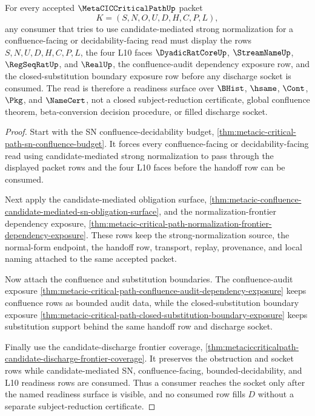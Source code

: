 \begin{theorem}
\label{thm:metacic-critical-path-sn-discharge-socket-readiness}
For every accepted $\MetaCICCriticalPathUp$ packet
$$
K=(S,N,O,U,D,H,C,P,L),
$$
any consumer that tries to use candidate-mediated strong normalization for a confluence-facing or decidability-facing read must display the rows $S,N,U,D,H,C,P,L$, the four L10 faces $\DyadicRatCoreUp$, $\StreamNameUp$, $\RegSeqRatUp$, and $\RealUp$, the confluence-audit dependency exposure row, and the closed-substitution boundary exposure row before any discharge socket is consumed. The read is therefore a readiness surface over $\BHist$, $\hsame$, $\Cont$, $\Pkg$, and $\NameCert$, not a closed subject-reduction certificate, global confluence theorem, beta-conversion decision procedure, or filled discharge socket.
\end{theorem}
\begin{proof}
Start with the SN confluence-decidability budget, \autoref{thm:metacic-critical-path-sn-confluence-budget}. It forces every confluence-facing or decidability-facing read using candidate-mediated strong normalization to pass through the displayed packet rows and the four L10 faces before the handoff row can be consumed.

Next apply the candidate-mediated obligation surface, \autoref{thm:metacic-confluence-candidate-mediated-sn-obligation-surface}, and the normalization-frontier dependency exposure, \autoref{thm:metacic-critical-path-normalization-frontier-dependency-exposure}. These rows keep the strong-normalization source, the normal-form endpoint, the handoff row, transport, replay, provenance, and local naming attached to the same accepted packet.

Now attach the confluence and substitution boundaries. The confluence-audit exposure \autoref{thm:metacic-critical-path-confluence-audit-dependency-exposure} keeps confluence rows as bounded audit data, while the closed-substitution boundary exposure \autoref{thm:metacic-critical-path-closed-substitution-boundary-exposure} keeps substitution support behind the same handoff row and discharge socket.

Finally use the candidate-discharge frontier coverage, \autoref{thm:metaciccriticalpath-candidate-discharge-frontier-coverage}. It preserves the obstruction and socket rows while candidate-mediated SN, confluence-facing, bounded-decidability, and L10 readiness rows are consumed. Thus a consumer reaches the socket only after the named readiness surface is visible, and no consumed row fills $D$ without a separate subject-reduction certificate.
\end{proof}

